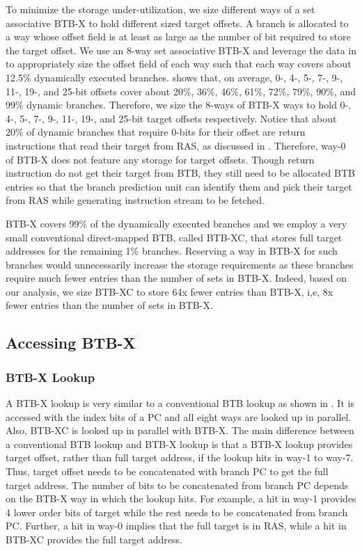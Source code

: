 To minimize the storage under-utilization, we size different ways of a set associative BTB-X to hold different sized target offsets. A branch is allocated to a way whose offset field is at least as large as the number of bit required to store the target offset. We use an 8-way set associative BTB-X and leverage the data in  to appropriately size the offset field of each way such that each way covers about 12.5\% dynamically executed branches.  shows that, on average, 0-, 4-, 5-, 7-, 9-, 11-, 19-, and 25-bit offsets cover about 20\%, 36\%, 46\%, 61\%, 72\%, 79\%, 90\%, and 99\% dynamic branches. Therefore, we size the 8-ways of BTB-X ways to hold 0-, 4-, 5-, 7-, 9-, 11-, 19-, and 25-bit target offsets respectively. Notice that about 20\% of dynamic branches that require 0-bits for their offset are return instructions that read their target from RAS, as discussed in . Therefore, way-0 of BTB-X does not feature any storage for target offsets. Though return instruction do not get their target from BTB, they still need to be allocated BTB entries so that the branch prediction unit can identify them and pick their target from RAS while generating instruction stream to be fetched.

BTB-X covers 99\% of the dynamically executed branches and we employ a very small conventional direct-mapped BTB, called BTB-XC, that stores full target addresses for the remaining 1\% branches. Reserving a way in BTB-X for such branches would unnecessarily increase the storage requirements as these branches require much fewer entries than the number of sets in BTB-X. Indeed, based on our analysis, we size BTB-XC to store 64x fewer entries than BTB-X, i,e, 8x fewer entries than the number of sets in BTB-X.

\subsection{Accessing BTB-X}

\subsubsection{BTB-X Lookup}
A BTB-X lookup is very similar to a conventional BTB lookup as shown in . It is accessed with the index bits of a PC and all eight ways are looked up in parallel. Also, BTB-XC is looked up in parallel with BTB-X. The main difference between a conventional BTB lookup and BTB-X lookup is that a BTB-X lookup provides target offset, rather than full target address, if the lookup hits in way-1 to way-7. Thus, target offset needs to be concatenated with branch PC to get the full target address. The number of bits to be concatenated from branch PC depends on the BTB-X way in which the lookup hits. For example, a hit in way-1 provides 4 lower order bits of target while the rest needs to be concatenated from branch PC. Further, a hit in way-0 implies that the full target is in RAS, while a hit in BTB-XC provides the full target address.

